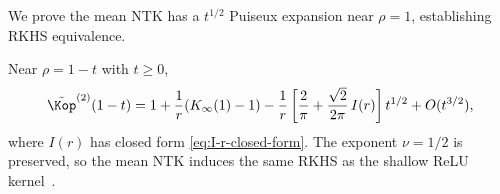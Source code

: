 We prove the mean NTK has a \( t^{1/2} \) Puiseux expansion near \( \rho=1 \), establishing RKHS equivalence.

\begin{theorem}\label{thm:puiseux-main}
Near \( \rho = 1-t \) with \( t \ge 0 \),
\begin{equation}
\label{eq:puiseux-main}
\tilde{\Kop}^{(2)}(1-t) = 1 + \frac{1}{r}(K_\infty(1)-1) - \frac{1}{r}\left[\frac{2}{\pi} + \frac{\sqrt{2}}{2\pi}\,I(r)\right] t^{1/2} + O(t^{3/2}),
\end{equation}
where \( I(r) \) has closed form \eqref{eq:I-r-closed-form}. The exponent \( \nu = 1/2 \) is preserved, so the mean NTK induces the same RKHS as the shallow ReLU kernel~\cite{bietti2021deepequalsshallowrelu}.
\end{theorem}

